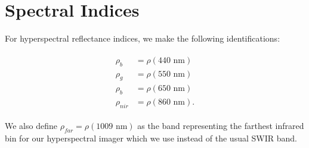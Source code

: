 \chapter{Spectral Indices}\label{appendix:spectral-indices}

For hyperspectral reflectance indices, we make the
following identifications:

\begin{align}\label{eq:ref-bands}
\begin{split}
    \rho_b &= \rho(440 \text{ nm}) \\
    \rho_g &= \rho(550 \text{ nm}) \\
    \rho_b &= \rho(650 \text{ nm}) \\
    \rho_{nir} &= \rho(860 \text{ nm}).
\end{split}
\end{align}

We also define $\rho_{far} = \rho(1009 \text{ nm})$ as the band
representing the farthest infrared bin for our hyperspectral imager
which we use instead of the usual SWIR band.

